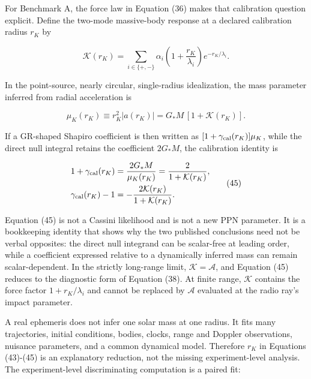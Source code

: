 \documentclass[
  american,
  11pt,
  letterpaper,
]{article}
\begin{document}
For Benchmark A, the force law in Equation (36) makes that calibration question explicit. Define the two-mode massive-body response at a declared calibration radius \(r_K\) by

\begin{equation}
\mathcal K(r_K)
=\sum_{i\in\{+,-\}}
\alpha_i\left(1+\frac{r_K}{\lambda_i}\right)e^{-r_K/\lambda_i}.
\tag{43}
\end{equation}

In the point-source, nearly circular, single-radius idealization, the mass parameter inferred from radial acceleration is

\begin{equation}
\mu_K(r_K)
\equiv r_K^2|a(r_K)|
=G_*M\,[1+\mathcal K(r_K)] .
\tag{44}
\end{equation}

If a GR-shaped Shapiro coefficient is then written as \([1+\gamma_{\rm cal}(r_K)]\mu_K\), while the direct null integral retains the coefficient \(2G_*M\), the calibration identity is

\begin{equation}
\begin{aligned}
& 1+\gamma_{\rm cal}(r_K)
=\frac{2G_*M}{\mu_K(r_K)}
=\frac{2}{1+\mathcal K(r_K)}, \\
& \gamma_{\rm cal}(r_K)-1
=-\frac{2\mathcal K(r_K)}{1+\mathcal K(r_K)} .
\end{aligned}
\tag{45}
\end{equation}

Equation (45) is not a Cassini likelihood and is not a new PPN parameter. It is a bookkeeping identity that shows why the two published conclusions need not be verbal opposites: the direct null integrand can be scalar-free at leading order, while a coefficient expressed relative to a dynamically inferred mass can remain scalar-dependent. In the strictly long-range limit, \(\mathcal K=\mathcal A\), and Equation (45) reduces to the diagnostic form of Equation (38). At finite range, \(\mathcal K\) contains the force factor \(1+r_K/\lambda_i\) and cannot be replaced by \(\mathcal A\) evaluated at the radio ray's impact parameter.

A real ephemeris does not infer one solar mass at one radius. It fits many trajectories, initial conditions, bodies, clocks, range and Doppler observations, nuisance parameters, and a common dynamical model. Therefore \(r_K\) in Equations (43)-(45) is an explanatory reduction, not the missing experiment-level analysis. The experiment-level discriminating computation is a paired fit:
\end{document}
